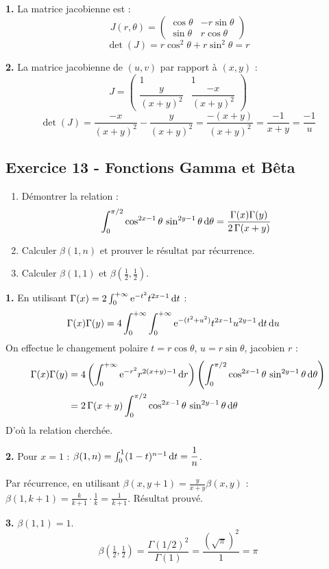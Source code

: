 \documentclass[12pt,a4paper]{article}
\begin{document}
\begin{boitecorrige}
\textbf{1.} La matrice jacobienne est :
\[
J(r,\theta) = \begin{pmatrix} \cos\theta & -r\sin\theta \\ \sin\theta & r\cos\theta \end{pmatrix}
\]
\[
\det(J) = r\cos^2\theta + r\sin^2\theta = r
\]

\textbf{2.} La matrice jacobienne de $(u,v)$ par rapport à $(x,y)$ :
\[
J = \begin{pmatrix} 1 & 1 \\ \dfrac{y}{(x+y)^2} & \dfrac{-x}{(x+y)^2} \end{pmatrix}
\]
\[
\det(J) = \frac{-x}{(x+y)^2} - \frac{y}{(x+y)^2} = \frac{-(x+y)}{(x+y)^2} = \frac{-1}{x+y} = \frac{-1}{u}
\]
\end{boitecorrige}

\newpage
\subsection*{Exercice 13 - Fonctions Gamma et Bêta \niveau{\difficile}}

\begin{boiteexercice}
\begin{enumerate}
  \item Démontrer la relation :
  \[
  \int_0^{\pi/2} \cos^{2x-1}\theta\,\sin^{2y-1}\theta\,\mathrm{d}\theta = \frac{\Gamma(x)\Gamma(y)}{2\,\Gamma(x+y)}
  \]
  \item Calculer $\beta(1,n)$ et prouver le résultat par récurrence.
  \item Calculer $\beta(1,1)$ et $\beta\!\left(\tfrac{1}{2},\tfrac{1}{2}\right)$.
\end{enumerate}
\end{boiteexercice}

\begin{boitecorrige}
\textbf{1.} En utilisant $\Gamma(x) = 2\int_0^{+\infty}\mathrm{e}^{-t^2}t^{2x-1}\,\mathrm{d} t$ :
\begin{align*}
\Gamma(x)\Gamma(y) &= 4\int_0^{+\infty}\int_0^{+\infty}\mathrm{e}^{-(t^2+u^2)}t^{2x-1}u^{2y-1}\,\mathrm{d} t\,\mathrm{d} u
\end{align*}
On effectue le changement polaire $t = r\cos\theta$, $u = r\sin\theta$, jacobien $r$ :
\begin{align*}
\Gamma(x)\Gamma(y) &= 4\left(\int_0^{+\infty}\mathrm{e}^{-r^2}r^{2(x+y)-1}\,\mathrm{d} r\right)\left(\int_0^{\pi/2}\cos^{2x-1}\theta\,\sin^{2y-1}\theta\,\mathrm{d}\theta\right) \\
&= 2\,\Gamma(x+y)\int_0^{\pi/2}\cos^{2x-1}\theta\,\sin^{2y-1}\theta\,\mathrm{d}\theta
\end{align*}
D'où la relation cherchée.

\textbf{2.} Pour $x=1$ : $\beta(1,n) = \int_0^1(1-t)^{n-1}\,\mathrm{d} t = \dfrac{1}{n}$.

Par récurrence, en utilisant $\beta(x,y+1) = \frac{y}{x+y}\beta(x,y)$ :
$\beta(1,k+1) = \frac{k}{k+1}\cdot\frac{1}{k} = \frac{1}{k+1}$. Résultat prouvé.

\textbf{3.} $\beta(1,1) = 1$.
\[
\beta\!\left(\tfrac{1}{2},\tfrac{1}{2}\right) = \frac{\Gamma(1/2)^2}{\Gamma(1)} = \frac{(\sqrt{\pi})^2}{1} = \pi
\]
\end{boitecorrige}
\end{document}
